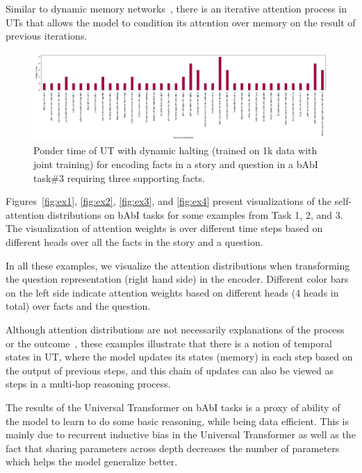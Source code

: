 Similar to dynamic memory networks~\citep{kumar2016ask}, there is an iterative attention process in UTs that allows the model to condition its attention over memory on the result of previous iterations. 
%

\begin{figure}[t]
 \centering
 \includegraphics[width=\textwidth]{04-part-03/chapter-06/figs_and_tables/fig_task3_example_ponder.png}
 \caption{Ponder time of UT with dynamic halting (trained on 1k data with joint training) for encoding facts in a story and question in a bAbI task\#3 requiring three supporting facts.}
 \label{fig:act_ponder}
\end{figure}
Figures~\ref{fig:ex1}, \ref{fig:ex2}, \ref{fig:ex3}, and \ref{fig:ex4} present visualizations of the self-attention distributions on bAbI tasks for some examples from Task 1, 2, and 3. The visualization of attention weights is over different time steps based on different heads over all the facts in the story and a question. 

In all these examples, we visualize the attention distributions when transforming the question representation (right hand side) in the encoder. Different color bars on the left side indicate attention weights based on different heads (4 heads in total) over facts and the question.

Although attention distributions are not necessarily explanations of the process or the outcome~\citep{attentionisnotexplnation}, these examples illustrate that there is a notion of temporal states in UT, where the model updates its states (memory) in each step based on the output of previous steps, and this chain of updates can also be viewed as steps in a multi-hop reasoning process. 


The results of the Universal Transformer on bAbI tasks is a proxy of ability of the model to learn to do some basic reasoning, while being data efficient.  
This is mainly due to recurrent inductive bias in the Universal Transformer as well as the fact that sharing parameters across depth decreases the number of parameters which helps the model generalize better.



